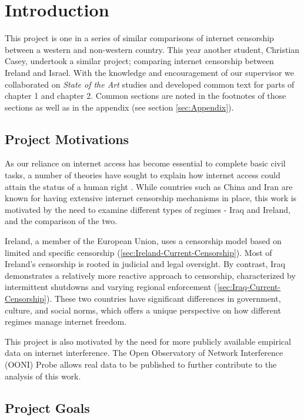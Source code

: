 \chapter{Introduction}

This project is one in a series of similar comparisons of internet censorship between a western and non-western country. This year another student, Christian Casey, undertook a similar project; comparing internet censorship between Ireland and Israel. With the knowledge and encouragement of our supervisor we collaborated on \textit{State of the Art} studies and developed common text for parts of chapter 1 and chapter 2. Common sections are noted in the footnotes of those sections as well as in the appendix (see section \ref{sec:Appendix}).

\section{Project Motivations}

As our reliance on internet access has become essential to complete basic civil tasks, a number of theories have sought to explain how internet access could attain the status of a human right \cite{shandler2019reality}. While countries such as China and Iran are known for having extensive internet censorship mechanisms in place, this work is motivated by the need to examine different types of regimes - Iraq and Ireland, and the comparison of the two.

Ireland, a member of the European Union, uses a censorship model based on limited and specific censorship (\ref{sec:Ireland-Current-Censorship}). Most of Ireland's censorship is rooted in judicial and legal oversight. By contrast, Iraq demonstrates a relatively more reactive approach to censorship, characterized by intermittent shutdowns and varying regional enforcement (\ref{sec:Iraq-Current-Censorship}). These two countries have significant differences in government, culture, and social norms, which offers a unique perspective on how different regimes manage internet freedom.

This project is also motivated by the need for more publicly available empirical data on internet interference. The Open Observatory of Network Interference (OONI) Probe allows real data to be published to further contribute to the analysis of this work.

\section{Project Goals}

